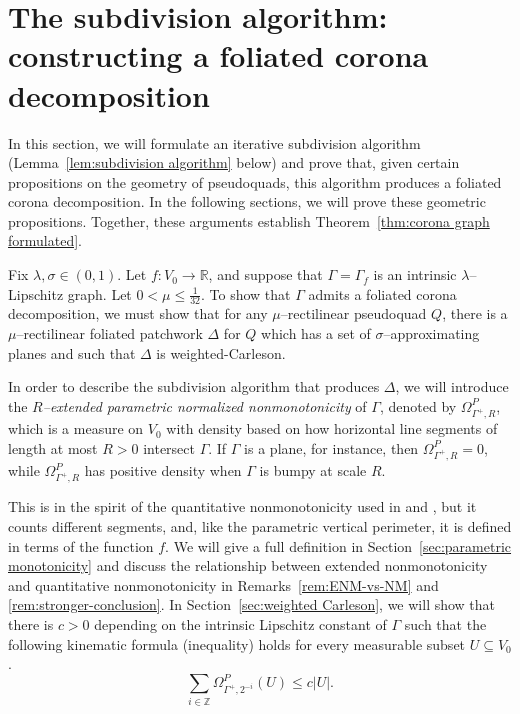\documentclass[11pt,reqno]{amsart}
\newcommand{\R}{\mathbb{R}}
\newcommand{\Z}{\mathbb{Z}}
\newcommand{\0}{\mathbf{0}}
\renewcommand{\1}{\mathbf 1}
\newcommand{\from}{\colon}
\renewcommand{\subset}{\subseteq}
\renewcommand{\le}{\leqslant}
\theoremstyle{remark}
\begin{document}
\section{The subdivision algorithm: constructing a foliated corona decomposition}\label{sec:subdiv algorithm}

In this section, we will formulate an iterative subdivision algorithm (Lemma~\ref{lem:subdivision algorithm} below) and prove that, given certain propositions on the geometry of pseudoquads, this algorithm produces a foliated corona decomposition.  In the following sections, we will prove these geometric propositions.  Together, these arguments establish Theorem~\ref{thm:corona graph formulated}.

Fix $\lambda,\sigma\in (0,1)$. Let $f\from V_0\to \R$, and suppose that $\Gamma=\Gamma_f$ is an intrinsic $\lambda$--Lipschitz graph.  Let $0<\mu\le \frac{1}{32}$.  To show that $\Gamma$ admits a foliated corona decomposition, we must show that for any $\mu$--rectilinear pseudoquad $Q$, there is a $\mu$--rectilinear foliated patchwork $\Delta$ for $Q$ which has a set of $\sigma$--approximating planes and such that $\Delta$ is weighted-Carleson.

In order to describe the subdivision algorithm that produces $\Delta$, we  will introduce the \emph{$R$--extended parametric normalized nonmonotonicity} of $\Gamma$, denoted by $\Omega^P_{\Gamma^+ ,R}$, which is a measure on $V_0$ with density based on how horizontal line segments of length at most $R>0$ intersect $\Gamma$.  If $\Gamma$ is a plane, for instance, then $\Omega^P_{\Gamma^+ ,R}=0$, while $\Omega^P_{\Gamma^+ ,R}$ has positive density when $\Gamma$ is bumpy at scale $R$.

This is in the spirit of the quantitative nonmonotonicity used in \cite{CKN} and \cite{NY18}, but it counts different segments, and, like the parametric vertical perimeter, it is defined in terms of the function $f$. We will give a full definition in Section~\ref{sec:parametric monotonicity} and discuss the relationship between extended nonmonotonicity and quantitative nonmonotonicity in Remarks~\ref{rem:ENM-vs-NM} and \ref{rem:stronger-conclusion}.
In Section~\ref{sec:weighted Carleson}, we will show that there is  $c>0$ depending on the intrinsic Lipschitz constant of $\Gamma$ such that the following kinematic formula (inequality) holds for every measurable subset $U\subset V_0$.
\begin{equation*}\label{eq:a priori bound kinematic Omega}
\sum_{i\in \Z} \Omega^P_{\Gamma^+,2^{-i}}(U)\le c |U|.
\end{equation*}
\end{document}
